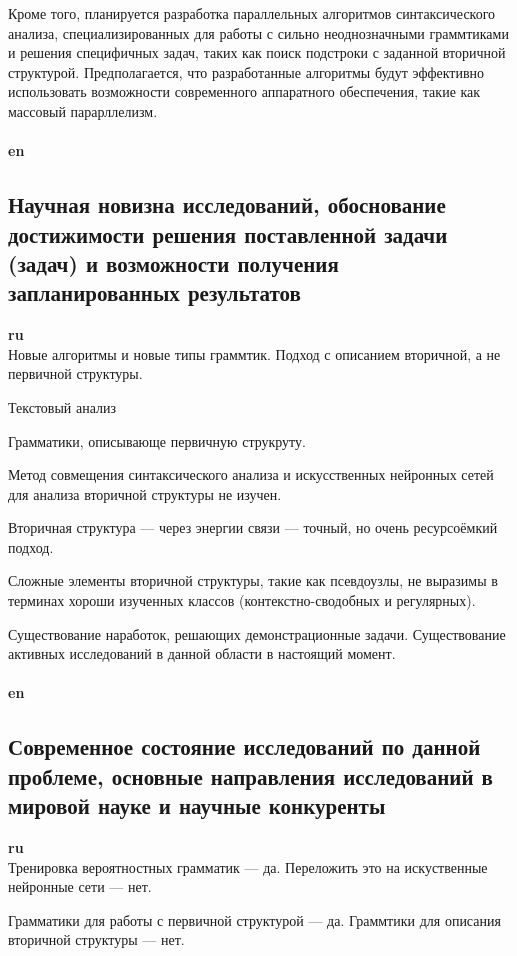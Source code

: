 \documentclass[12pt]{article}  %
\theoremstyle{remark}
\begin{document}
Кроме того, планируется разработка параллельных алгоритмов синтаксического анализа, специализированных для работы с сильно неоднозначными граммтиками и решения специфичных задач, таких как поиск подстроки с заданной вторичной структурой.
Предполагается, что разработанные алгоритмы будут эффективно использовать возможности современного аппаратного обеспечения, такие как массовый парарллелизм.
\\
\\
\textbf{en}\\


\subsection{Научная новизна исследований, обоснование достижимости решения поставленной задачи (задач) и возможности получения запланированных результатов}

\textbf{ru}\\
Новые алгоритмы и новые типы граммтик.
Подход с описанием вторичной, а не первичной структуры.

Текстовый анализ

Грамматики, описывающе первичную струкруту.

Метод совмещения синтаксического анализа и искусственных нейронных сетей для анализа вторичной структуры не изучен.

Вторичная структура --- через энергии связи --- точный, но очень ресурсоёмкий подход.

Сложные элементы вторичной структуры, такие как псевдоузлы, не выразимы в терминах хороши изученных классов (контекстно-сводобных и регулярных).

Существование наработок, решающих демонстрационные задачи.
Существование активных исследований в данной области в настоящий момент.
\\
\\
\textbf{en}\\


\subsection{Современное состояние исследований по данной проблеме, основные направления исследований в мировой науке и научные конкуренты}

\textbf{ru}\\
Тренировка вероятностных грамматик --- да.
Переложить это на искуственные нейронные сети --- нет.

Грамматики для работы с первичной структурой --- да.
Граммтики для описания вторичной структуры --- нет.
\end{document}
